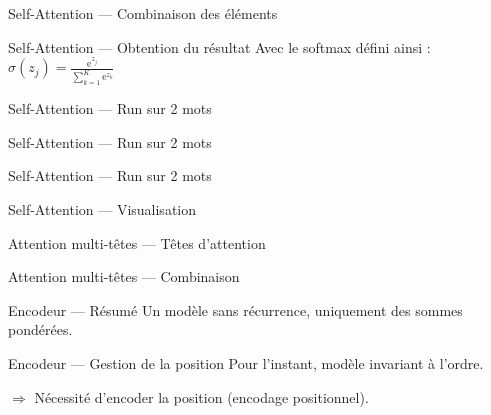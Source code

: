 \begin{frame}{Self-Attention --- Combinaison des éléments}
\end{frame}

\begin{frame}{Self-Attention --- Obtention du résultat}
  Avec le softmax défini ainsi : $\sigma(z_j)=\frac {\mathrm{e}^{z_j}}{\sum _{k=1}^{K}\mathrm{e}^{z_{k}}}$
\end{frame}

\begin{frame}{Self-Attention --- Run sur 2 mots}
\end{frame}

\begin{frame}{Self-Attention --- Run sur 2 mots}
\end{frame}

\begin{frame}{Self-Attention --- Run sur 2 mots}
\end{frame}

\begin{frame}{Self-Attention --- Visualisation}
\end{frame}

\begin{frame}{Attention multi-têtes --- Têtes d'attention}
\end{frame}

\begin{frame}{Attention multi-têtes --- Combinaison}
\end{frame}

\begin{frame}{Encodeur --- Résumé}
  Un modèle sans récurrence, uniquement des sommes pondérées.

\end{frame}

\begin{frame}{Encodeur --- Gestion de la position}
  Pour l'instant, modèle invariant à l'ordre.

  $\Rightarrow$ Nécessité d'encoder la position (encodage positionnel).
\end{frame}


